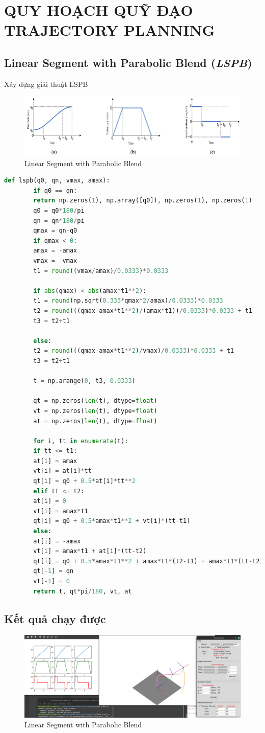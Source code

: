 \section{QUY HOẠCH QUỸ ĐẠO TRAJECTORY PLANNING}
\subsection{Linear Segment with Parabolic Blend (\textit{LSPB})}
Xây dựng giải thuật LSPB
\begin{figure}[H]
	\centering
	\includegraphics[width=1\linewidth]{Images/lspb.png}
	\caption{Linear Segment with Parabolic Blend}
	\label{fig:enter-label10}
\end{figure}

\vspace{0.5cm}
\begin{lstlisting}[language=python]
	def lspb(q0, qn, vmax, amax):
		if q0 == qn:
		return np.zeros(1), np.array([q0]), np.zeros(1), np.zeros(1)
		q0 = q0*180/pi
		qn = qn*180/pi
		qmax = qn-q0
		if qmax < 0:
		amax = -amax
		vmax = -vmax
		t1 = round((vmax/amax)/0.0333)*0.0333
		
		if abs(qmax) < abs(amax*t1**2):
		t1 = round(np.sqrt(0.333*qmax*2/amax)/0.0333)*0.0333
		t2 = round(((qmax-amax*t1**2)/(amax*t1))/0.0333)*0.0333 + t1
		t3 = t2+t1
		
		else:
		t2 = round(((qmax-amax*t1**2)/vmax)/0.0333)*0.0333 + t1
		t3 = t2+t1
		
		t = np.arange(0, t3, 0.0333)
		
		qt = np.zeros(len(t), dtype=float)
		vt = np.zeros(len(t), dtype=float)
		at = np.zeros(len(t), dtype=float)
		
		for i, tt in enumerate(t):
		if tt <= t1:
		at[i] = amax
		vt[i] = at[i]*tt
		qt[i] = q0 + 0.5*at[i]*tt**2
		elif tt <= t2:
		at[i] = 0
		vt[i] = amax*t1
		qt[i] = q0 + 0.5*amax*t1**2 + vt[i]*(tt-t1)
		else:
		at[i] = -amax
		vt[i] = amax*t1 + at[i]*(tt-t2)
		qt[i] = q0 + 0.5*amax*t1**2 + amax*t1*(t2-t1) + amax*t1*(tt-t2) - 0.5*amax*(tt-t2)**2
		qt[-1] = qn
		vt[-1] = 0
		return t, qt*pi/180, vt, at
\end{lstlisting}


\subsection{Kết quả chạy được}
\begin{figure}[H]
	\centering
	\includegraphics[width=1\linewidth]{Images/demo_trajectory.png}
	\caption{Linear Segment with Parabolic Blend}
	\label{fig:enter-label11}
\end{figure}